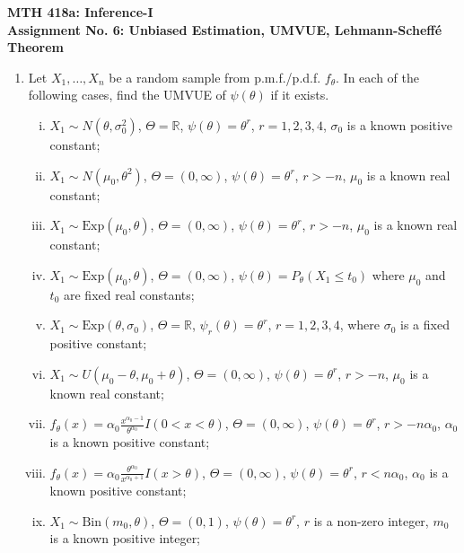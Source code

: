 \documentclass[12pt]{article}
\begin{document}
\begin{center}
    \textbf{\large MTH 418a: Inference-I} \\
    \textbf{Assignment No. 6: Unbiased Estimation, UMVUE, Lehmann-Scheffé Theorem}
\end{center}

\begin{enumerate}
    \item Let $X_{1}, \dots, X_{n}$ be a random sample from p.m.f./p.d.f. $f_{\theta}$. In each of the following cases, find the UMVUE of $\psi(\theta)$ if it exists.
    \begin{enumerate}[(i)]
        \item $X_{1} \sim N(\theta, \sigma_{0}^{2})$, $\Theta = \mathbb{R}$, $\psi(\theta) = \theta^{r}$, $r = 1, 2, 3, 4$, $\sigma_{0}$ is a known positive constant;
        \item $X_{1} \sim N(\mu_{0}, \theta^{2})$, $\Theta = (0, \infty)$, $\psi(\theta) = \theta^{r}$, $r > -n$, $\mu_{0}$ is a known real constant;
        \item $X_{1} \sim \text{Exp}(\mu_{0}, \theta)$, $\Theta = (0, \infty)$, $\psi(\theta) = \theta^{r}$, $r > -n$, $\mu_{0}$ is a known real constant;
        \item $X_{1} \sim \text{Exp}(\mu_{0}, \theta)$, $\Theta = (0, \infty)$, $\psi(\theta) = P_{\theta}(X_{1} \le t_{0})$ where $\mu_{0}$ and $t_{0}$ are fixed real constants;
        \item $X_{1} \sim \text{Exp}(\theta, \sigma_{0})$, $\Theta = \mathbb{R}$, $\psi_{r}(\theta) = \theta^{r}$, $r = 1, 2, 3, 4$, where $\sigma_{0}$ is a fixed positive constant;
        \item $X_{1} \sim U(\mu_{0} - \theta, \mu_{0} + \theta)$, $\Theta = (0, \infty)$, $\psi(\theta) = \theta^{r}$, $r > -n$, $\mu_{0}$ is a known real constant;
        \item $f_{\theta}(x) = \alpha_{0} \frac{x^{\alpha_{0}-1}}{\theta^{\alpha_{0}}} I(0 < x < \theta)$, $\Theta = (0, \infty)$, $\psi(\theta) = \theta^{r}$, $r > -n\alpha_{0}$, $\alpha_{0}$ is a known positive constant;
        \item $f_{\theta}(x) = \alpha_{0} \frac{\theta^{\alpha_{0}}}{x^{\alpha_{0}+1}} I(x > \theta)$, $\Theta = (0, \infty)$, $\psi(\theta) = \theta^{r}$, $r < n\alpha_{0}$, $\alpha_{0}$ is a known positive constant;
        \item $X_{1} \sim \text{Bin}(m_{0}, \theta)$, $\Theta = (0, 1)$, $\psi(\theta) = \theta^{r}$, $r$ is a non-zero integer, $m_{0}$ is a known positive integer;

\end{enumerate}
\end{enumerate}
\end{document}
